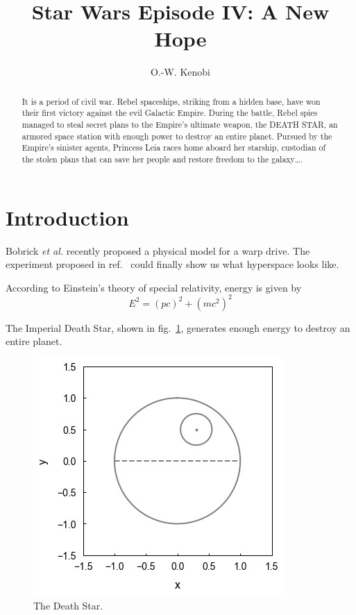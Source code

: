 \documentclass[aps,prb,twocolumn,groupedaddress,10pt,longbibliography,nofootinbib]{revtex4-2}
\begin{document}
\title{Star Wars Episode IV: A New Hope}

\author{O.-W. Kenobi}


\begin{abstract}
It is a period of civil war. Rebel spaceships, striking from a hidden base, have won their first victory against the evil Galactic Empire. During the battle, Rebel spies managed to steal secret plans to the Empire’s ultimate weapon, the DEATH STAR, an armored space station with enough power to destroy an entire planet. Pursued by the Empire’s sinister agents, Princess Leia races home aboard her starship, custodian of the stolen plans that can save her people and restore freedom to the galaxy….
\end{abstract}

\maketitle

\section{Introduction}

Bobrick \textit{et al.} recently proposed a physical model for a warp drive\cite{Bobrick_2021}. The experiment proposed in ref.~\cite{PhysRevLett.128.163603} could finally show us what hyperspace looks like.

According to Einstein's theory of special relativity, energy is given by
\begin{equation}
E^2=(pc)^2+(mc^2)^2
\label{eq:Esquared}
\end{equation}

The Imperial Death Star, shown in fig.~\ref{fig:death_star}, generates enough energy to destroy an entire planet.
\begin{figure}%
\includegraphics[width=\columnwidth]{deathstarfig}%
\caption{The Death Star.}%
\label{fig:death_star}%
\end{figure}
\end{document}
